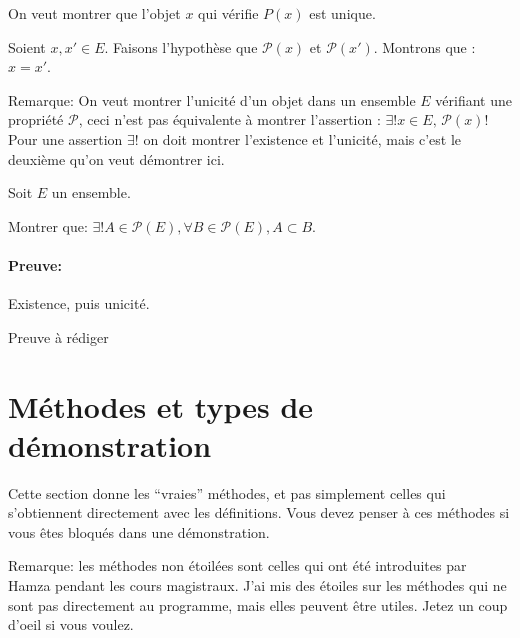 \documentclass{article}
\begin{document}
On veut montrer que l'objet  $x$ qui vérifie $P(x)$ est unique.

\begin{tcolorbox}[colback=green!5!white,colframe=green!75!black,title=Point méthode 4.7]

Soient \( x, x' \in E \).  
Faisons l'hypothèse que \( \mathcal{P}(x) \) et \( \mathcal{P}(x') \).  
Montrons que : \( x = x'. \) 

\end{tcolorbox}

Remarque: On veut montrer l’unicité d’un objet dans un ensemble \( E \) vérifiant une propriété \( \mathcal{P} \), ceci n’est pas équivalente à montrer l’assertion : \(\exists! x \in E, \, \mathcal{P}(x)\)! Pour une assertion $\exists!$ on doit montrer l'existence et l'unicité, mais c'est le deuxième qu'on veut démontrer ici.



\begin{tcolorbox}[colback=cyan!5!white,colframe=cyan!75!black,title=Exercice]

Soit $E$ un ensemble. 

Montrer que: $\exists ! A \in \mathcal{P}(E), \forall B \in \mathcal{P}(E), A \subset B$.

\end{tcolorbox}


\paragraph{Preuve:} Existence, puis unicité.

\noindent Preuve à rédiger
















\section{Méthodes et types de démonstration}


Cette section donne les ``vraies'' méthodes, et pas simplement celles qui s'obtiennent directement avec les définitions. Vous devez penser à ces méthodes si vous êtes bloqués dans une démonstration.

Remarque: les méthodes non étoilées sont celles qui ont été introduites par Hamza pendant les cours magistraux. J'ai mis des étoiles sur les méthodes qui ne sont pas directement au programme, mais elles peuvent être utiles. Jetez un coup d'oeil si vous voulez.
\end{document}
